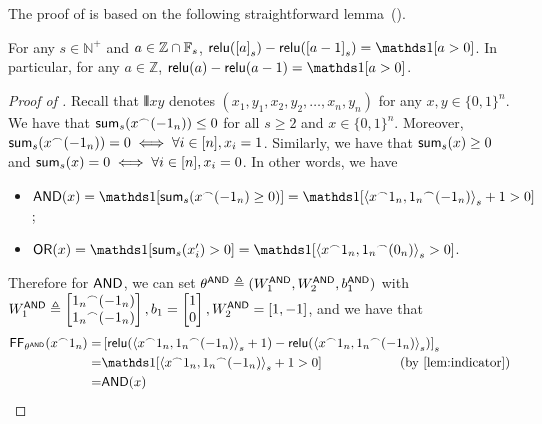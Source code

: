 The proof of  is based on the following straightforward lemma~().
\begin{lemma}\label{lem:indicator}
	For any $s\in\mathbb{N}^+$ and $a\in\mathbb{Z}\cap \mathbb{F}_s$, $\relu(\rds{a})-\relu(\rds{a-1}) = \ind[a>0]$. 
	In particular, for any $a\in\mathbb{Z}$, $\relu(a)-\relu(a-1) = \ind[a>0]$.
\end{lemma}


\begin{proof}[Proof of ]


	Recall that $\interleave{x}{y}$ denotes $(x_1,y_1,x_2,y_2,\ldots,x_n,y_n)$ for any $x,y\in\{0,1\}^n$. We have that $\mathsf{sum}_s({x}^\frown{(-1_n)})\le 0$ for all $s\ge 2$ and $x\in\{0,1\}^n$. Moreover, $\mathsf{sum}_s({x}^\frown{(-1_n)})= 0 \iff \forall i\in [n], x_i= 1$. Similarly, we have that $\mathsf{sum}_s(x)\ge 0$ and $\mathsf{sum}_s(x) = 0\iff \forall i \in [n], x_i = 0$. In other words, we have  
	\begin{itemize}
		\item $\AND(x) = \ind[\sums(\interleave{x}{(-1_n)}\ge 0 )] = \ind[\inner{\interleave{x}{1_n}}{\interleave{1_n}{(-1_n)}}_s+1 >0]$;
		\item $\OR(x) = \ind[\sums(x'_i)>0] = \ind[\inner{\interleave{x}{1_n}}{\interleave{1_n}{(0_n)}}_s >0]$.
	\end{itemize}
	Therefore for $\mathsf{AND}$, we can set $\theta^{\mathsf{AND}}\triangleq (W_1^{\mathsf{AND}},W_2^{\mathsf{AND}},b_1^{\mathsf{AND}})$ with $W_1^{\mathsf{AND}}\triangleq \begin{bmatrix}
		{1_n}^\frown{(-1_n)} \\
		{1_n}^\frown{(-1_n)}
	\end{bmatrix} , b_1 = \begin{bmatrix}
		1\\
		0
	\end{bmatrix}, W_2^{\mathsf{AND}} = [1,-1]$, and we have that 
	\begin{align}
		\FF_{\theta^\AND}(\interleave{x}{1_n}) = &\rds{\relu(\inner{\interleave{x}{1_n}}{\interleave{1_n}{(-1_n)}}_s+1) - \relu(\inner{\interleave{x}{1_n}}{\interleave{1_n}{(-1_n)}}_s)} \notag\\
		= &  \ind[\inner{\interleave{x}{1_n}}{\interleave{1_n}{(-1_n)}}_s+1>0] \qquad\qquad\qquad\text{(by \Cref{lem:indicator})} \notag\\
		= & \AND(x)\notag
	\end{align}
	

\end{proof}
